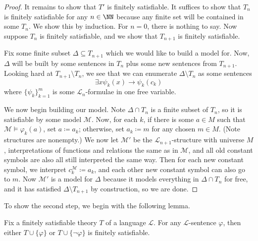 \documentclass[../notes.tex]{subfiles}
\begin{document}
\begin{proof}
	It remains to show that $T'$ is finitely satisfiable. It suffices to show that $T_n$ is finitely satisfiable for any $n\in\NN$ because any finite set will be contained in some $T_n$. We show this by induction. For $n=0$, there is nothing to say. Now suppose $T_n$ is finitely satisfiable, and we show that $T_{n+1}$ is finitely satisfiable.
	
	Fix some finite subset $\Delta\subseteq T_{n+1}$ which we would like to build a model for. Now, $\Delta$ will be built by some sentences in $T_n$ plus some new sentences from $T_{n+1}$. Looking hard at $T_{n+1}\setminus T_n$, we see that we can enumerate $\Delta\setminus T_n$ as some sentences
	\[\exists x\psi_k(x)\to \psi_k(c_k)\]
	where $\{\psi_k\}_{k=1}^m$ is some $\mathcal L_n$-formulae in one free variable.
	
	We now begin building our model. Note $\Delta\cap T_n$ is a finite subset of $T_n$, so it is satisfiable by some model $\mathcal M$. Now, for each $k$, if there is some $a\in M$ such that $\mathcal M\models\varphi_k(a)$, set $a\coloneqq a_k$; otherwise, set $a_k\coloneqq m$ for any chosen $m\in M$. (Note structures are nonempty.) We now let $\mathcal M'$ be the $\mathcal L_{n+1}$-structure with universe $M$, interpretations of functions and relations the same as in $\mathcal M$, and all old constant symbols are also all still interpreted the same way. Then for each new constant symbol, we interpret $c_k^\mathcal M\coloneqq a_k$, and each other new constant symbol can also go to $m$. Now $\mathcal M'$ is a model for $\Delta$ because it models everything in $\Delta\cap T_n$ for free, and it has satisfied $\Delta\setminus T_{n+1}$ by construction, so we are done.
\end{proof}
To show the second step, we begin with the following lemma.
\begin{lemma} \label{lem:fs-can-extend-complete}
	Fix a finitely satisfiable theory $T$ of a language $\mathcal L$. For any $\mathcal L$-sentence $\varphi$, then either $T\cup\{\varphi\}$ or $T\cup\{\lnot\varphi\}$ is finitely satisfiable.
\end{lemma}
\end{document}
